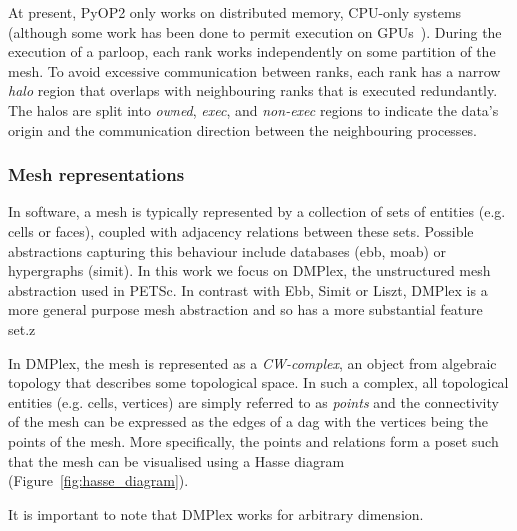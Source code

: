   At present, PyOP2 only works on distributed memory, CPU-only systems (although some work has been done to permit execution on GPUs~\cite{fenics2021-kulkarni}).
  During the execution of a parloop, each rank works independently on some partition of the mesh.
  To avoid excessive communication between ranks, each rank has a narrow \textit{halo} region that overlaps with neighbouring ranks that is executed redundantly.
  The halos are split into \textit{owned}, \textit{exec}, and \textit{non-exec} regions to indicate the data's origin and the communication direction between the neighbouring processes.



\subsubsection{Mesh representations}


In software, a mesh is typically represented by a collection of sets of entities (e.g. cells or faces), coupled with adjacency relations between these sets.
Possible abstractions capturing this behaviour include databases (ebb, moab) or hypergraphs (simit).
In this work we focus on DMPlex, the unstructured mesh abstraction used in PETSc.
In contrast with Ebb, Simit or Liszt, DMPlex is a more general purpose mesh abstraction and so has a more substantial feature set.z

In DMPlex, the mesh is represented as a \textit{CW-complex}, an object from algebraic topology that describes some topological space.
In such a complex, all topological entities (e.g. cells, vertices) are simply referred to as \textit{points} and the connectivity of the mesh can be expressed as the edges of a \gls{dag} with the vertices being the points of the mesh.
More specifically, the points and relations form a \gls{poset} such that the mesh can be visualised using a Hasse diagram (Figure~\ref{fig:hasse_diagram}).

It is important to note that DMPlex works for arbitrary dimension.

